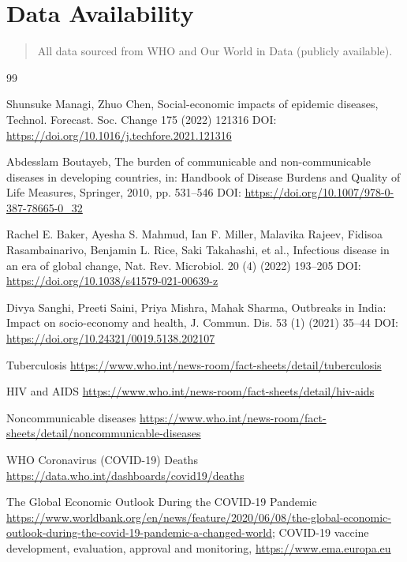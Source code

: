 \documentclass[10pt]{NSP1}
\begin{document}
\section*{Data Availability}

\begin{quote}
All data sourced from WHO and Our World in Data (publicly available).
\end{quote}

\begin{thebibliography}{99}

Shunsuke Managi, Zhuo Chen, Social-economic impacts of epidemic diseases, Technol. Forecast. Soc. Change 175 (2022) 121316 DOI: \url{https://doi.org/10.1016/j.techfore.2021.121316}

Abdesslam Boutayeb, The burden of communicable and non-communicable diseases in developing countries, in: Handbook of Disease Burdens and Quality of Life Measures, Springer, 2010, pp. 531--546 DOI: \url{https://doi.org/10.1007/978-0-387-78665-0_32}

Rachel E. Baker, Ayesha S. Mahmud, Ian F. Miller, Malavika Rajeev, Fidisoa Rasambainarivo, Benjamin L. Rice, Saki Takahashi, et al., Infectious disease in an era of global change, Nat. Rev. Microbiol. 20 (4) (2022) 193--205 DOI: \url{https://doi.org/10.1038/s41579-021-00639-z}

Divya Sanghi, Preeti Saini, Priya Mishra, Mahak Sharma, Outbreaks in India: Impact on socio-economy and health, J. Commun. Dis. 53 (1) (2021) 35--44 DOI: \url{https://doi.org/10.24321/0019.5138.202107}

Tuberculosis \url{https://www.who.int/news-room/fact-sheets/detail/tuberculosis}

HIV and AIDS \url{https://www.who.int/news-room/fact-sheets/detail/hiv-aids}

Noncommunicable diseases \url{https://www.who.int/news-room/fact-sheets/detail/noncommunicable-diseases}

WHO Coronavirus (COVID-19) Deaths \url{https://data.who.int/dashboards/covid19/deaths}

The Global Economic Outlook During the COVID-19 Pandemic \url{https://www.worldbank.org/en/news/feature/2020/06/08/the-global-economic-outlook-during-the-covid-19-pandemic-a-changed-world}; COVID-19 vaccine development, evaluation, approval and monitoring, \url{https://www.ema.europa.eu}


\end{thebibliography}
\end{document}
